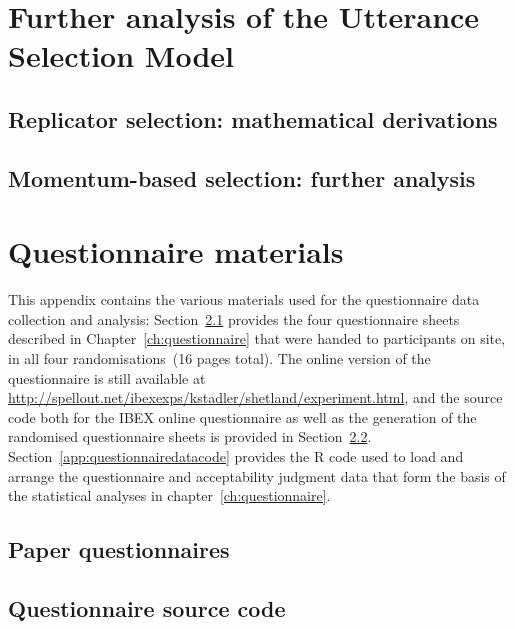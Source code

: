 \documentclass[oneside]{book}
\begin{document}
\chapter[Further analysis of the USM]{Further analysis of the Utterance Selection Model}
\label{app:math}

\section{Replicator selection: mathematical derivations}
\label{app:usm}
%

\section{Momentum-based selection: further analysis}
\label{app:momentum}
%

\chapter{Questionnaire materials}
\label{app:questionnaire}
This appendix contains the various materials used for the questionnaire data collection and analysis: Section~\ref{app:paperquestionnaire} provides the four questionnaire sheets described in Chapter~\ref{ch:questionnaire} that were handed to participants on site, in all four randomisations~(16 pages total). The online version of the questionnaire is still available at \url{http://spellout.net/ibexexps/kstadler/shetland/experiment.html}, and the source code both for the IBEX online questionnaire as well as the generation of the randomised questionnaire sheets is provided in Section~\ref{app:questionnairecode}. Section~\ref{app:questionnairedatacode} provides the R code used to load and arrange the questionnaire and acceptability judgment data that form the basis of the statistical analyses in chapter~\ref{ch:questionnaire}.

\section{Paper questionnaires}
\label{app:paperquestionnaire}
%
%
\section{Questionnaire source code}
\label{app:questionnairecode}
\end{document}
